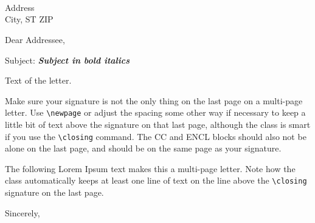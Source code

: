 \documentclass[12pt, OUO]{SNLletter}  %
\begin{document}
    \begin{letter}{  
    	\thedate \\
    	~ \\
        \theaddressee \\
        Address \\
        City, ST ZIP
        }
    
        \opening{Dear Addressee,}

        Subject: \textbf{\textit{Subject in bold italics}}

		\par
        Text of the letter.
        
        Make sure your signature is not the only thing on the last page on a multi-page
        letter.  Use \texttt{\textbackslash newpage} or adjust the spacing some other way if necessary to
        keep a little bit of text above the signature on that last page, although the class is smart if you use the \texttt{\textbackslash closing} command.
        The CC and ENCL blocks should also not be alone on the last page,
        and should be on the same page as your signature.
        
        The following Lorem Ipsum text makes this a multi-page letter. Note how the class automatically keeps at least one line of text on the line above the \texttt{\textbackslash closing} signature on the last page.

		\lipsum[1-8]

        \closing{Sincerely,}



		
		
    \end{letter}
\end{document}
